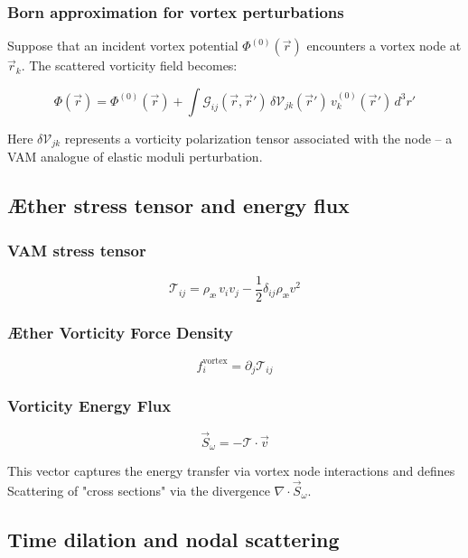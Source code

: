 \subsubsection*{Born approximation for vortex perturbations}

Suppose that an incident vortex potential \(\Phi^{(0)}(\vec{r})\) encounters a vortex node at \(\vec{r}_k\). The scattered vorticity field becomes:

\[
    \Phi(\vec{r}) = \Phi^{(0)}(\vec{r}) + \int \mathcal{G}_{ij}(\vec{r}, \vec{r}') \, \delta \mathcal{V}_{jk}(\vec{r}') \, v_k^{(0)}(\vec{r}') \, d^3r'
\]

Here \(\delta \mathcal{V}_{jk}\) represents a vorticity polarization tensor associated with the node – a VAM analogue of elastic moduli perturbation.

\subsection{Æther stress tensor and energy flux}

\subsubsection*{VAM stress tensor}

\[
    \mathcal{T}_{ij} = \rho_\text{\ae} \, v_i v_j - \frac{1}{2} \delta_{ij} \rho_\text{\ae} v^2
\]

\subsubsection*{Æther Vorticity Force Density}

\[
    f_i^\text{vortex} = \partial_j \mathcal{T}_{ij}
\]

\subsubsection*{Vorticity Energy Flux}

\[
    \vec{S}_\omega = - \mathcal{T} \cdot \vec{v}
\]

This vector captures the energy transfer via vortex node interactions and defines Scattering of "cross sections" via the divergence \(\nabla \cdot \vec{S}_\omega\).

\subsection{Time dilation and nodal scattering}


